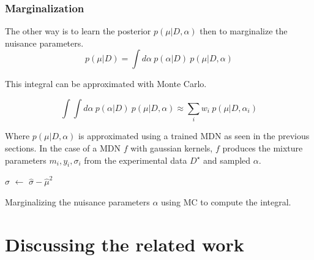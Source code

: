 \subsubsection{Marginalization} %
\label{subsub:marginalization}

The other way is to learn the posterior $p(\mu | D, \alpha)$ then to marginalize the nuisance parameters.
\begin{equation}
    p(\mu | D) = \int d\alpha ~ p(\alpha | D) ~ p(\mu | D, \alpha)
\end{equation}


This integral can be approximated with Monte Carlo.

\begin{equation}
  \int \int d\alpha ~ p(\alpha | D) ~ p(\mu | D, \alpha)
  \approx \sum_i w_i ~ p(\mu | D, \alpha_i)
\end{equation}

Where $p(\mu | D, \alpha)$ is approximated using a trained MDN as seen in the previous sections.
In the case of a MDN $f$ with gaussian kernels, $f$ produces the mixture parameters $m_i, y_i, \sigma_i$ from the experimental data $D^\star$ and sampled $\alpha$.

\begin{algorithm}[H]
$\hat\sigma$  $\gets$ $\hat\sigma - \hat\mu^2$ \;
\caption{Marginalizing the nuisance parameters $\alpha$ using MC to compute the integral.}
\end{algorithm}







\section{Discussing the related work} %
\label{sec:discussing_the_related_work}

